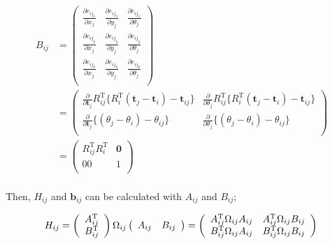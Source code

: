 \documentclass{article}
\begin{document}
\[
\begin{align}
B_{ij} &=
\left(
  \begin{array}{ccc}
    \frac{\partial e_{ij_x}}{\partial x_j} & \frac{\partial e_{ij_x}}{\partial y_j} & \frac{\partial e_{ij_x}}{\partial \theta_j} \\
    \frac{\partial e_{ij_y}}{\partial x_j} & \frac{\partial e_{ij_y}}{\partial y_j} & \frac{\partial e_{ij_y}}{\partial \theta_j} \\
    \frac{\partial e_{ij_\theta}}{\partial x_j} & \frac{\partial e_{ij_\theta}}{\partial y_j} & \frac{\partial e_{ij_\theta}}{\partial \theta_j} \\
  \end{array}
\right) \\ &=
\left(
  \begin{array}{ccc}
    \frac{\partial }{\partial \bm{t}_j} R_{ij}^{\mathrm{T}}\{R_i^{\mathrm{T}}(\bm{t}_j-\bm{t}_i)-\bm{t}_{ij}\} & \frac{\partial }{\partial \theta_j} R_{ij}^{\mathrm{T}}\{R_i^{\mathrm{T}}(\bm{t}_j-\bm{t}_i)-\bm{t}_{ij}\} \\
                                         \frac{\partial }{\partial \bm{t}_j} \{(\theta_j - \theta_i) - \theta_{ij}\} & \frac{\partial }{\partial \theta_j} \{(\theta_j - \theta_i) - \theta_{ij}\} \\
  \end{array}
\right) \\ &=
\left(
  \begin{array}{ccc}
    R_{ij}^{\mathrm{T}} R_i^{\mathrm{T}} & \bm{0} \\
                                      00 &      1 \\
  \end{array}
\right) \\
\end{align}
\]

Then, $H_{ij}$ and $\bm{b}_{ij}$ can be calculated with $A_{ij}$ and $B_{ij}$;

\[
H_{ij} =
\left(
  \begin{array}{cc}
    A_{ij}^{\mathrm{T}} \\
    B_{ij}^{\mathrm{T}} \\
  \end{array}
\right)
\Omega_{ij}
\left(
  \begin{array}{cc}
    A_{ij} & B_{ij} \\
  \end{array}
\right) =
\left(
  \begin{array}{cc}
    A_{ij}^{\mathrm{T}}\Omega_{ij}A_{ij} & A_{ij}^{\mathrm{T}}\Omega_{ij}B_{ij} \\
    B_{ij}^{\mathrm{T}}\Omega_{ij}A_{ij} & B_{ij}^{\mathrm{T}}\Omega_{ij}B_{ij} \\
  \end{array}
\right) \\
\]
\end{document}
